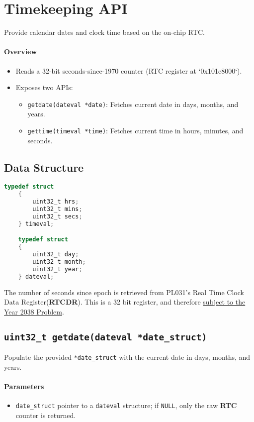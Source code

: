 \newpage
\section{Timekeeping API}
Provide calendar dates and clock time based on the on-chip RTC.

\paragraph{Overview}
\begin{itemize}
    \item Reads a 32-bit seconds-since-1970 counter (RTC register at `0x101e8000`).
    \item Exposes two APIs:
    \begin{itemize}
        \item \texttt{getdate(dateval *date)}: Fetches current date in days, months, and years.
        \item \texttt{gettime(timeval *time)}: Fetches current time in hours, minutes, and seconds.
    \end{itemize}
\end{itemize}

\subsection*{Data Structure}

\begin{lstlisting}[language=C, caption={Structure definitions for time and date values.}, label={lst:datetime_structs}]
    typedef struct
    {
        uint32_t hrs;
        uint32_t mins;
        uint32_t secs;
    } timeval;

    typedef struct
    {
        uint32_t day;
        uint32_t month;
        uint32_t year;
    } dateval;
\end{lstlisting}

\noindent
The number of seconds since epoch is retrieved from PL031's Real Time Clock 
Data Register(\textbf{RTCDR}). This is a 32 bit register, and therefore 
\underline{subject to the Year 2038 Problem}.

\subsection{\texttt{uint32\_t getdate(dateval *date\_struct)}}
Populate the provided \texttt{*date\_struct} with the current date in days, months, and years.

\paragraph{Parameters}
\begin{itemize}
    \item \texttt{date\_struct} pointer to a \texttt{dateval} structure; if \texttt{NULL}, 
    only the raw \textbf{RTC} counter is returned.
\end{itemize}

